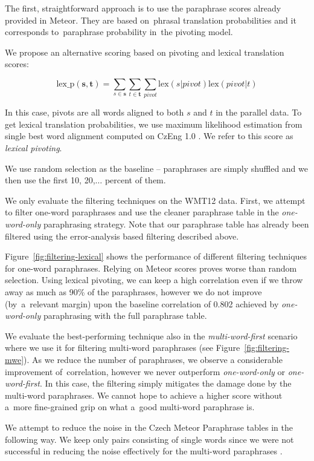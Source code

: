 \documentclass[11pt]{article}
\def\Fref#1{Figure~\ref{#1}}
\begin{document}
The first, straightforward approach is to use the paraphrase scores already
provided in Meteor. They are based on~phrasal translation probabilities
and it corresponds to~paraphrase probability in~the pivoting model.

We propose an alternative scoring based on pivoting and lexical translation
scores:

$$\text{lex\_p}(\mathbf{s},\mathbf{t}) = \sum_{s \in \mathbf{s}}\sum_{t \in
\mathbf{t}}\sum_{pivot}\text{lex}(s|pivot)\text{lex}(pivot|t)$$

In this case, pivots are all words aligned to both $s$ and $t$ in the parallel
data. To get lexical translation probabilities, we use maximum likelihood
estimation from single best word alignment computed on CzEng 1.0
\cite{czeng10:lrec2012}. We refer to this score as \emph{lexical
pivoting}.

We use random selection as the baseline -- paraphrases are simply shuffled and we
then use the first 10, 20,$\ldots$ percent of them.

We only evaluate the filtering techniques on the WMT12 data. First, we attempt
to filter one-word paraphrases and use the cleaner paraphrase table in the
\emph{one-word-only} paraphrasing strategy. Note that our paraphrase table has
already been filtered using the error-analysis based filtering described above.

\Fref{fig:filtering-lexical} shows the performance of different filtering
techniques for one-word paraphrases. Relying on Meteor scores proves worse than
random selection. Using lexical pivoting, we can keep a high correlation even if we
throw away as much as 90\% of the paraphrases, however we do not improve 
(by~a~relevant margin) upon the baseline correlation of 0.802 achieved by
\emph{one-word-only} paraphrasing with the full paraphrase table.

We evaluate the best-performing technique also in the \textit{multi-word-first}
scenario where we use it for filtering multi-word paraphrases (see
\Fref{fig:filtering-mwe}). As we reduce the number of paraphrases, we observe a
considerable improvement of~correlation, however we never outperform
\textit{one-word-only} or \textit{one-word-first}. In this case, the filtering
simply mitigates the damage done by the multi-word paraphrases. We
cannot hope to achieve a higher score without a~more fine-grained grip on what
a~good multi-word paraphrase is.


We attempt to reduce the noise in the Czech Meteor Paraphrase tables in the following way. We 
keep only pairs consisting of single words since we were not successful in reducing the noise
effectively for the multi-word paraphrases \cite{barancikova2014}. 
\end{document}
